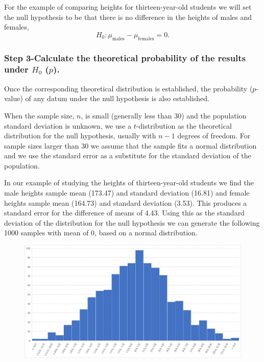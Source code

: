 \documentclass[
]{book}
\theoremstyle{definition}
\theoremstyle{definition}
\theoremstyle{definition}
\theoremstyle{definition}
\theoremstyle{remark}
\begin{document}
For the example of comparing heights for thirteen-year-old students we will set the null hypothesis to be that there is no difference in the heights of males and females, \[H_0: \mu_{\mbox{males}} - \mu_{\mbox{females}} = 0.\]

\hypertarget{step-3-calculate-the-theoretical-probability-of-the-results-under-h_0-p.}{%
\subsubsection*{\texorpdfstring{Step 3-Calculate the theoretical probability of the results under \(H_0\) (\(p\)).}{Step 3-Calculate the theoretical probability of the results under H\_0 (p).}}\label{step-3-calculate-the-theoretical-probability-of-the-results-under-h_0-p.}}

Once the corresponding theoretical distribution is established, the probability (\(p\)-value) of any datum under the null hypothesis is also established.

When the sample size, \(n\), is small (generally less than 30) and the population standard deviation is unknown, we use a \(t\)-distribution as the theoretical distribution for the null hypothesis, usually with \(n-1\) degrees of freedom. For sample sizes larger than 30 we assume that the sample fits a normal distribution and we use the standard error as a substitute for the standard deviation of the population.

In our example of studying the heights of thirteen-year-old students we find the male heights sample mean (173.47) and standard deviation (16.81) and female heights sample mean (164.73) and standard deviation (3.53). This produces a standard error for the difference of means of 4.43. Using this as the standard deviation of the distribution for the null hypothesis we can generate the following 1000 samples with mean of 0, based on a normal distribution.

\begin{figure}

{\centering \includegraphics[width=0.7\linewidth]{images/heights_13_dist} 

}

\end{figure}
\end{document}
